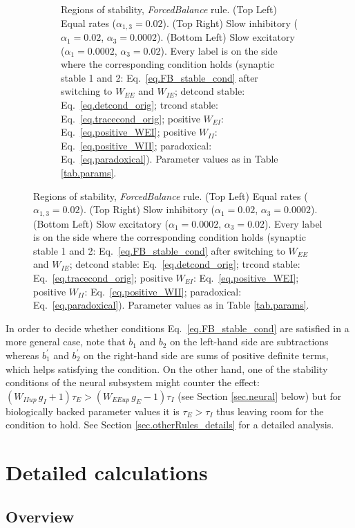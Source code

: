 \documentclass[twocolumn]{article}
\newcommand{\EE}{\mathit{EE}}
\newcommand{\EI}{\mathit{EI}}
\newcommand{\IE}{\mathit{IE}}
\newcommand{\II}{\mathit{II}}
\newcommand{\up}{\mathit{up}}
\begin{document}
\begin{figure}[!ht]
{\begin{figure}[H]
\caption{Regions of stability, {\em ForcedBalance} rule. (Top Left) Equal rates ($\alpha_{1,3}=0.02$). (Top Right) Slow inhibitory ($\alpha_1=0.02$, $\alpha_3=0.0002$). (Bottom Left) Slow excitatory ($\alpha_1=0.0002$, $\alpha_3=0.02$). Every label is on the side where the  corresponding  condition  holds (synaptic stable 1 and 2: Eq.\ \ref{eq.FB_stable_cond} after switching to $W_{\EE}$ and $W_{\IE}$; detcond stable: Eq.\ \ref{eq.detcond_orig}; trcond stable: Eq.\ \ref{eq.tracecond_orig}; positive $W_{\EI}$: Eq.\ \ref{eq.positive_WEI}; positive $W_{\II}$: Eq.\ \ref{eq.positive_WII}; paradoxical: Eq.\ \ref{eq.paradoxical}). Parameter values as in Table \ref{tab.params}.}
\label{fig.FB_stability}
\end{figure}}
\end{figure}




In order to decide whether conditions Eq.\ \ref{eq.FB_stable_cond} are satisfied in a more general case, note that $b_1$ and $b_2$ on the left-hand side are subtractions whereas $b_1^\prime$ and $b_2^\prime$ on the right-hand side are sums of positive definite terms, which helps satisfying the condition. On the other hand, one of the stability conditions of the neural subsystem might counter the effect: $(W_{\II\up} \, g_I + 1)\tau_E > (W_{\EE\up} \, g_E - 1)\tau_I$ (see Section \ref{sec.neural} below) but for biologically backed parameter values it is $\tau_E > \tau_I$ thus leaving room for the condition to hold. See Section \ref{sec.otherRules_details} for a detailed analysis.




\section{Detailed calculations}
\label{sec.Details}

\subsection{Overview}
\end{document}
